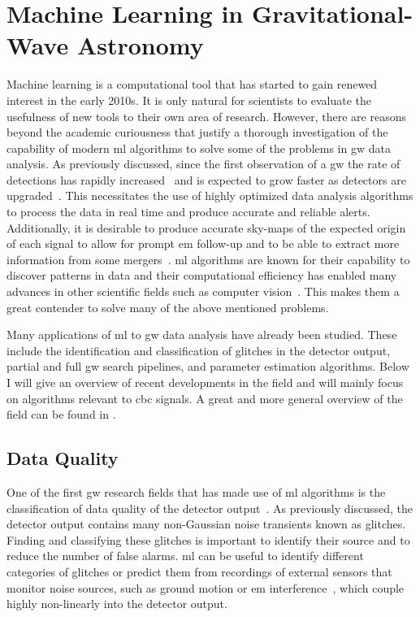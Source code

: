\section{Machine Learning in Gravitational-Wave Astronomy}\label{sec:ml-gw-hist}
Machine learning is a computational tool that has started to gain renewed interest in the early 2010s. It is only natural for scientists to evaluate the usefulness of new tools to their own area of research. However, there are reasons beyond the academic curiousness that justify a thorough investigation of the capability of modern \acrshort{ml} algorithms to solve some of the problems in \acrshort{gw} data analysis. As previously discussed, since the first observation of a \acrshort{gw} the rate of detections has rapidly increased~\cite{Nitz:2021zwj} and is expected to grow faster as detectors are upgraded~\cite{KAGRA:2013rdx, Cahillane:2022pqm}. This necessitates the use of highly optimized data analysis algorithms to process the data in real time and produce accurate and reliable alerts. Additionally, it is desirable to produce accurate sky-maps of the expected origin of each signal to allow for prompt \acrshort{em} follow-up and to be able to extract more information from some mergers~\cite{Nitz:2020vym}. \acrshort{ml} algorithms are known for their capability to discover patterns in data and their computational efficiency has enabled many advances in other scientific fields such as computer vision~\cite{Goodfellow:2016:DNN, krizhevsky:2012}. This makes them a great contender to solve many of the above mentioned problems.

Many applications of \acrshort{ml} to \acrshort{gw} data analysis have already been studied. These include the identification and classification of glitches in the detector output, partial and full \acrshort{gw} search pipelines, and parameter estimation algorithms. Below I will give an overview of recent developments in the field and will mainly focus on algorithms relevant to \acrshort{cbc} signals. A great and more general overview of the field can be found in \cite{Cuoco:2020ogp}.

\subsection{Data Quality}
One of the first \acrshort{gw} research fields that has made use of \acrshort{ml} algorithms is the classification of data quality of the detector output~\cite{Mukherjee:2010zza, Biswas:2013wfa, Powell:2015ona, Powell:2016rkl}. As previously discussed, the detector output contains many non-Gaussian noise transients known as glitches. Finding and classifying these glitches is important to identify their source and to reduce the number of false alarms. \acrshort{ml} can be useful to identify different categories of glitches or predict them from recordings of external sensors that monitor noise sources, such as ground motion or \acrshort{em} interference~\cite{Effler:2015aaa}, which couple highly non-linearly into the detector output.

